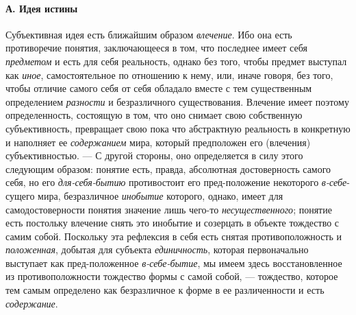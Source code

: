 \documentclass[twoside]{article}
\begin{document}
{\paragraph[А. Идея истины]{А. Идея истины}
Субъективная идея есть ближайшим образом
{\em влечение}. Ибо она
есть противоречие понятия, заключающееся в том, что последнее имеет себя
{\em предметом} и есть
для себя реальность, однако без того, чтобы предмет выступал как {\em иное},
самостоятельное по отношению к нему, или, иначе говоря, без
того, чтобы отличие самого себя от себя обладало вместе с тем существенным
определением {\em разности}
и безразличного существования. Влечение имеет поэтому
определенность, состоящую в том, что оно снимает свою собственную
субъективность, превращает свою пока что абстрактную реальность в
конкретную и наполняет ее
{\em содержанием} мира,
который предположен его (влечения) субъективностью. — С
другой стороны, оно определяется в силу этого следующим образом: понятие
есть, правда, абсолютная достоверность самого себя, но его
{\em для-себя-бытию}
противостоит его пред-положение некоторого
{\em в-себе}{}-сущего
мира, безразличное {\em инобытие}
которого, однако, имеет для самодостоверности понятия
значение лишь чего-то
{\em несущественного};
понятие есть постольку влечение снять это инобытие и
созерцать в объекте тождество с самим собой. Поскольку эта рефлексия в себя
есть снятая противоположность и
{\em положенная}, добытая
для субъекта {\em единичность},
которая первоначально выступает как пред-положенное
{\em в-себе-бытие}, мы
имеем здесь восстановленное из противоположности тождество формы с самой
собой, — тождество, которое тем самым
определено как безразличное к форме в ее различенности и
есть {\em содержание}.

}
\end{document}
